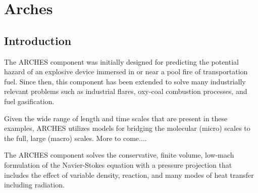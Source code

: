 
\chapter{Arches}

\section{Introduction}
The ARCHES component was initially designed for predicting the potential hazard of an explosive device immersed in or near a pool fire of transportation fuel.  Since then, this component has been extended to solve many industrially relevant problems such as industrial flares, oxy-coal combustion processes, and fuel gasification.  

Given the wide range of length and time scales that are present in these examples, ARCHES utilizes models for bridging the molecular (micro) scales to the full, large (macro) scales.  More to come....

The ARCHES component solves the conservative, finite volume, low-mach formulation of the Navier-Stokes equation with a pressure projection that includes the effect of variable density, reaction, and many modes of heat transfer including radiation.  

